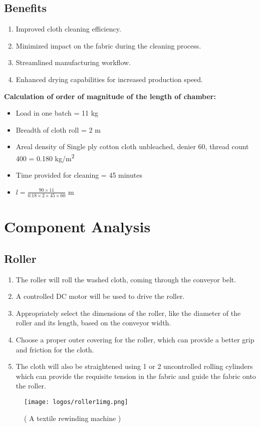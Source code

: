 \documentclass[table]{rapportCS}
\begin{document}
\subsection{Benefits}
\begin{enumerate}[label=$\bullet$]
    \item Improved cloth cleaning efficiency.
    \item Minimized impact on the fabric during the cleaning process.
    \item Streamlined manufacturing workflow.
    \item Enhanced drying capabilities for increased production speed.
\end{enumerate}
\textbf{Calculation of order of magnitude of the length of chamber:}
\begin{itemize}[label=$\bullet$]
    \item Load in one batch = 11 kg
    \item Breadth of cloth roll = 2 m
    \item Areal density  of Single ply cotton cloth unbleached, denier 60, thread count 400 = 0.180 kg/m\textsuperscript{2} 
    \item Time provided for cleaning = 45 minutes
    \item \( l = \frac{90 \times 11}{0.18 \times 2 \times 45 \times 60} \) m
\end{itemize}
\clearpage
\section{Component Analysis}\label{sec:compana}
\subsection{Roller}\label{sec:roller}
\begin{enumerate}
  \item The roller will roll the washed cloth, coming through the conveyor belt.
  \item A controlled DC motor will be used to drive the roller.
  \item Appropriately select the dimensions of the roller, like the diameter of the roller and its length, based on the conveyor width.
  \item Choose a proper outer covering for the roller, which can provide a better grip and friction for the cloth.
  \item The cloth will also be straightened using 1 or 2 uncontrolled rolling cylinders which can provide the requisite tension in the fabric and guide the fabric onto the roller.
\end{enumerate}
\begin{figure}[h]
    \centering
    \texttt{[image: logos/roller1img.png]}
    \caption{ ( A textile rewinding machine )                    
}
    \label{fig:outlinemindmap}
\end{figure}
\end{document}
